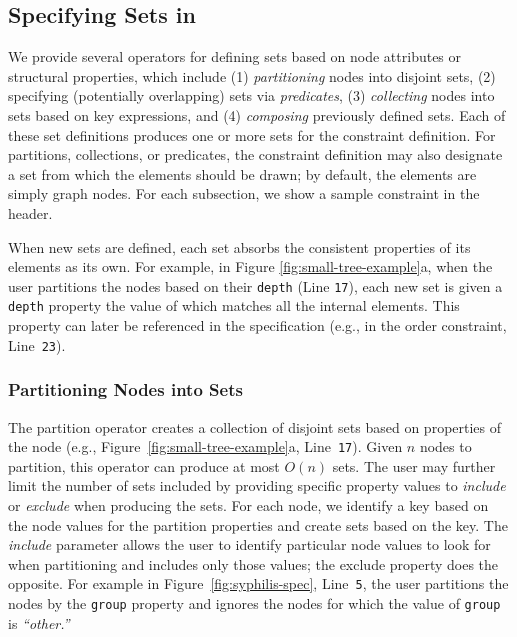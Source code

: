\vspace{-10px}
\subsection{Specifying Sets in \projectname}
We provide several operators for defining sets based on node attributes 
or structural properties, which include (1) \emph{partitioning} nodes 
into disjoint sets, (2) specifying (potentially overlapping) sets via
\emph{predicates}, (3) \emph{collecting} nodes into sets based on key expressions,
and (4) \emph{composing} previously defined sets. Each of these set
definitions produces one or more sets for the constraint definition. For
partitions, collections, or predicates, the constraint definition may also 
designate a set from which the elements should be drawn; by default, the
elements are simply graph nodes. For each subsection, we show a sample
\projectname constraint in the header.

When new sets are defined, each set absorbs the consistent properties of 
its elements as its own. For example, in Figure \ref{fig:small-tree-example}a, when the user
partitions the nodes based on their \texttt{depth} (Line
\texttt{17}), each new set is given a \texttt{depth} property the value of which 
matches all the internal elements. This property can later be referenced 
in the \projectname specification (e.g., in the order constraint, Line~\texttt{23}).

\subsubsection{Partitioning Nodes into Sets}
The partition operator creates a collection of disjoint sets based on
properties of the node
(e.g., Figure~\ref{fig:small-tree-example}a, Line~\texttt{17}).
Given $n$ nodes to partition, this operator can produce at most $O(n)$ 
sets. The user may further limit 
the number of sets included by providing specific property values to 
\emph{include} or \emph{exclude} when producing the sets.
For each node, we identify a key based on the node values for the partition
properties and create sets based on the key. The \emph{include} parameter allows
the user to identify particular node values to look for when partitioning
and includes only those values; the exclude property does the opposite. 
For example in Figure~\ref{fig:syphilis-spec}, Line~\texttt{5}, the user
partitions the nodes by the \texttt{group} property and ignores the nodes
for which the value of \texttt{group} is \emph{``other.''}

